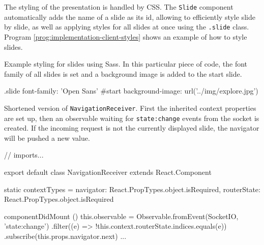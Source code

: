 The styling of the presentation is handled by CSS. The \texttt{Slide} component automatically adds the name of a slide as its id, allowing to efficiently style slide by slide, as well as applying styles for all slides at once using the \texttt{.slide} class. Program \ref{prog:implementation-client-styles} shows an example of how to style slides.

\begin{program}
\caption{Example styling for slides using Sass. In this particular piece of code, the font family of all slides is set and a background image is added to the start slide.}
\label{prog:implementation-client-styles}
\begin{CssCode}
  .slide
    font-family: 'Open Sans'
  #start
    background-image: url('../img/explore.jpg')
\end{CssCode}
\end{program}

\begin{program}
\caption{Shortened version of \texttt{NavigationReceiver}. First the inherited context properties are set up, then an observable waiting for \texttt{state:change} events from the socket is created. If the incoming request is not the currently displayed slide, the navigator will be pushed a new value.}
\label{prog:usage-network-sync-navigation-receiver}
\begin{JsCode}
// imports...

export default class NavigationReceiver extends React.Component {
  static contextTypes = {
    navigator:   React.PropTypes.object.isRequired,
    routerState: React.PropTypes.object.isRequired
  }

  componentDidMount () {
    this.observable = Observable.fromEvent(SocketIO, 'state:change')
      .filter((e) => !this.context.routerState.indices.equals(e))
      .subscribe(this.props.navigator.next)
  }
  ...
}
\end{JsCode}
\end{program}
%
